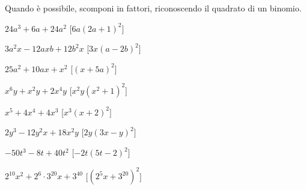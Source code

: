 \begin{esercizio}[\Ast]
\label{ese:div.021}
Quando è possibile, scomponi in fattori, riconoscendo il quadrato di un 
binomio.
\begin{multicols}{2}
\begin{enumeratea}
 \item \(24a^{3}+6a+24a^{2}\) \hfill [\(6a(2a+1)^{2}\)]
 \item \(3a^{2}x-12axb+12b^{2}x\) \hfill [\(3x(a-2b)^{2}\)]
 \item \(25a^{2}+10ax+x^{2}\) \hfill [\((x+5a)^{2}\)]
 \item \(x^{6}y+x^{2}y+2x^{4}y\) \hfill [\(x^{2}y\left(x^{2}+1\right)^{2}\)]
 \item \(x^{5}+4x^{4}+4x^{3}\) \hfill [\(x^{3}(x+2)^{2}\)]
 \item \(2y^{3}-12y^{2}x+18x^{2}y\) \hfill [\(2y(3x-y)^{2}\)]
 \item \(-50t^{3}-8t+40t^{2}\) \hfill [\(-2t(5t-2)^{2}\)]
 \item \(2^{10}x^{2}+2^{6}\cdot 3^{20}x+3^{40}\) 
  \hfill [\(\left(2^{5}x+3^{20}\right)^{2}\)]
\end{enumeratea}
\end{multicols}
\end{esercizio}


\newpage %

